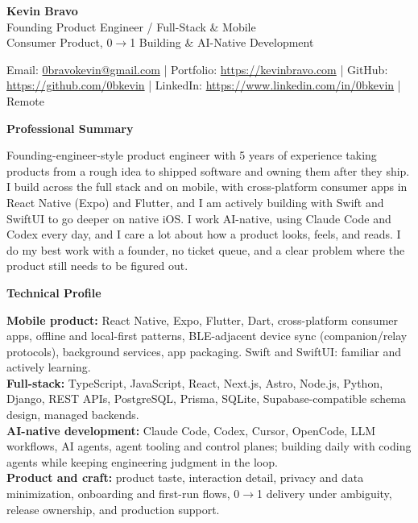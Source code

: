 \documentclass[10pt]{article}
\newcommand{\sectiontitle}[1]{%
    \vspace{5pt}
    \begin{center}
        \textbf{#1}
    \end{center}
    \vspace{-6pt}
}
\begin{document}
\raggedright

\begin{center}
    {\LARGE \textbf{Kevin Bravo}}\\
    Founding Product Engineer / Full-Stack \& Mobile \\
    Consumer Product, 0$\rightarrow$1 Building \& AI-Native Development \\
    \hrulefill
\end{center}

\begin{center}
    Email: \href{mailto:0bravokevin@gmail.com}{0bravokevin@gmail.com}
    | Portfolio: \href{https://kevinbravo.com}{https://kevinbravo.com}
    | GitHub: \href{https://github.com/0bkevin}{https://github.com/0bkevin}
    | LinkedIn: \href{https://www.linkedin.com/in/0bkevin/}{https://www.linkedin.com/in/0bkevin}
    | Remote
\end{center}

\sectiontitle{Professional Summary}
Founding-engineer-style product engineer with 5 years of experience taking products from a rough idea to shipped software and owning them after they ship. I build across the full stack and on mobile, with cross-platform consumer apps in React Native (Expo) and Flutter, and I am actively building with Swift and SwiftUI to go deeper on native iOS. I work AI-native, using Claude Code and Codex every day, and I care a lot about how a product looks, feels, and reads. I do my best work with a founder, no ticket queue, and a clear problem where the product still needs to be figured out.

\sectiontitle{Technical Profile}
\textbf{Mobile product:} React Native, Expo, Flutter, Dart, cross-platform consumer apps, offline and local-first patterns, BLE-adjacent device sync (companion/relay protocols), background services, app packaging. Swift and SwiftUI: familiar and actively learning. \\
\textbf{Full-stack:} TypeScript, JavaScript, React, Next.js, Astro, Node.js, Python, Django, REST APIs, PostgreSQL, Prisma, SQLite, Supabase-compatible schema design, managed backends. \\
\textbf{AI-native development:} Claude Code, Codex, Cursor, OpenCode, LLM workflows, AI agents, agent tooling and control planes; building daily with coding agents while keeping engineering judgment in the loop. \\
\textbf{Product and craft:} product taste, interaction detail, privacy and data minimization, onboarding and first-run flows, 0$\rightarrow$1 delivery under ambiguity, release ownership, and production support.
\end{document}
